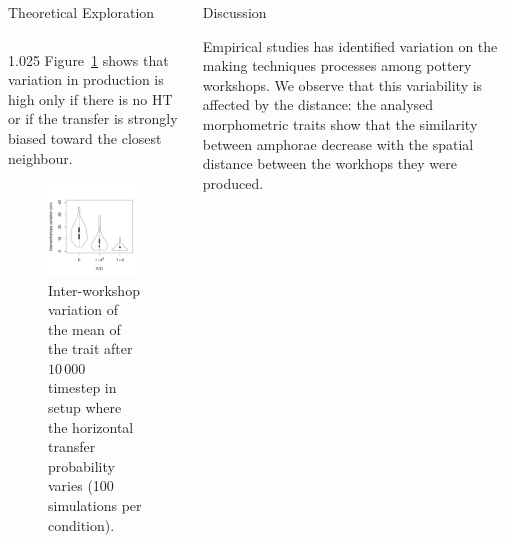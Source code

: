 \documentclass[final]{beamer}
\newlength{\sepwid}
\newlength{\onecolwid}
\newlength{\twocolwid}
\begin{document}
\begin{frame}[t]
\begin{columns}[t]
\begin{column}{\twocolwid}
\begin{block}{Theoretical Exploration}
\begin{columns}[t,totalwidth=\twocolwid]
\begin{column}{1.025\onecolwid}
Figure~\ref{fig:resmod} shows that variation in production is high only if there is no HT or if the transfer is strongly biased toward the closest neighbour.
\vspace{-1cm}

    \begin{figure}[h!]
    \centering
	\includegraphics[width=0.5\linewidth]{images/interworkshopvar.pdf}
\singlespace
\vspace{-.8cm}
\caption{Inter-workshop variation of the mean of the trait after $10\,000$ timestep in setup where the horizontal transfer probability varies (100 simulations per condition).}
	\label{fig:resmod}
    \end{figure}
\vspace{-1cm}
\end{column}
\end{columns}

\end{block}
\end{column}



\begin{column}{\onecolwid} %

\begin{block}{Discussion}
\justify

Empirical studies has identified variation on the making techniques processes among pottery workshops. We observe that this variability is affected by the distance: the analysed morphometric traits show that the similarity between amphorae decrease with the spatial distance between the workhops they were produced.


\end{block}
\end{column}
\end{columns}
\end{frame}
\end{document}
